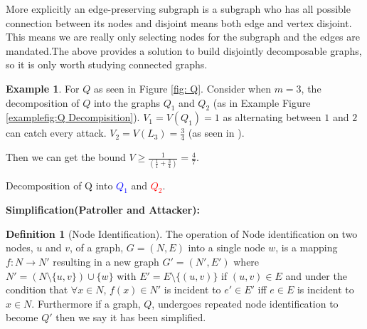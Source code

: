 \documentclass[a4paper,10pt]{article}
\theoremstyle{definition}
\newtheorem{definition}[theorem]{Definition}
\theoremstyle{definition}
\newtheorem{example}[theorem]{Example}
\theoremstyle{remark}
\theoremstyle{definition}
\begin{document}
More explicitly an edge-preserving subgraph is a subgraph who has all possible connection between its nodes and disjoint means both edge and vertex disjoint. This means we are really only selecting nodes for the subgraph and the edges are mandated.The above provides a solution to build disjointly decomposable graphs, so it is only worth studying connected graphs.


\begin{example}
For $Q$ as seen in Figure \ref{fig: Q}. Consider when $m=3$, the decomposition of $Q$ into the graphs $Q_{1}$ and $Q_{2}$ (as in Example Figure \ref{examplefig:Q Decompisition}). $V_{1}=V(Q_{1})=1$ as alternating between $1$ and $2$ can catch every attack. $V_{2}=V(L_{3})=\frac{3}{4}$ (as seen in \cite{Alpern2011} ). 

Then we can get the bound $V \geq \frac{1}{(\frac{1}{1}+\frac{3}{4})}=\frac{4}{7}$.
\end{example}

\begin{myfigure}
\begin{center}
\end{center}
\caption{Decomposition of Q into \textcolor{blue}{$Q_{1}$} and \textcolor{red}{$Q_{2}$}.}
\label{examplefig:Q Decompisition}
\end{myfigure}

\textbf{Simplification(Patroller and Attacker):}

\begin{definition}[Node Identification]
The operation of Node identification on two nodes, $u$ and $v$, of a graph, $G=(N,E)$ into a single node $w$, is a mapping $f:N \rightarrow N'$ resulting in a new graph $G'=(N',E')$ where $N'=(N \setminus  \{u,v\}) \cup \{w\}$ with $E'=E \setminus \{(u,v)\}$ if $(u,v) \in E$ and under the condition that $\forall x \in N$, $f(x) \in N'$ is incident to $e' \in E'$ iff $e \in E$ is incident to $x \in N$.
Furthermore if a graph, $Q$, undergoes repeated node identification to become $Q'$ then we say it has been simplified. 
\end{definition}
\end{document}
